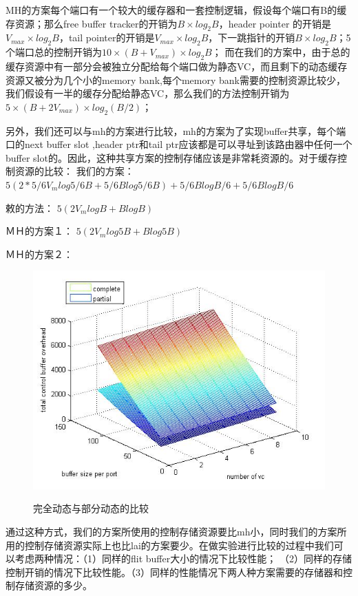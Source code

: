﻿\documentclass[10pt,journal]{IEEEtran}
\begin{document}
MH的方案每个端口有一个较大的缓存器和一套控制逻辑，假设每个端口有B的缓存资源；那么free buffer tracker的开销为$B\times log_2 B$，header pointer 
的开销是$V_{max}\times log_2 B$，tail pointer的开销是$V_{max}\times log_2 B$，下一跳指针的开销$B\times log_2 B$；5个端口总的控制开销为$10\times(B+V_{max})\times log_2B$；
而在我们的方案中，由于总的缓存资源中有一部分会被独立分配给每个端口做为静态VC，而且剩下的动态缓存资源又被分为几个小的memory bank,每个memory bank需要的控制资源比较少，我们假设有一半的缓存分配给静态VC，那么我们的方法控制开销为$5\times(B+2V_{max})\times log_2(B/2)$；

另外，我们还可以与mh的方案进行比较，mh的方案为了实现buffer共享，每个端口的next buffer slot ,header ptr和tail ptr应该都是可以寻址到该路由器中任何一个buffer slot的。因此，这种共享方案的控制存储应该是非常耗资源的。对于缓存控制资源的比较：
我们的方案：
$5(2*5/6V_mlog5/6B+5/6Blog5/6B)+5/6BlogB/6+5/6BlogB/6$

敕的方法：
$5(2V_mlogB+BlogB)$

ＭＨ的方案１： 
$5(2V_mlog5B+Blog5B)$

ＭＨ的方案２：

\begin{figure}
  \centering
  \includegraphics[scale=0.45]{figures/dynamic_vs_partial.jpg}\\
  \caption{完全动态与部分动态的比较}\label{comparions}
\end{figure}

通过这种方式，我们的方案所使用的控制存储资源要比mh小，同时我们的方案所用的控制存储资源实际上也比lai的方案要少。在做实验进行比较的过程中我们可以考虑两种情况：（1）同样的flit buffer大小的情况下比较性能； （2）同样的存储控制开销的情况下比较性能。（3）同样的性能情况下两人种方案需要的存储器和控制存储资源的多少。
\end{document}
